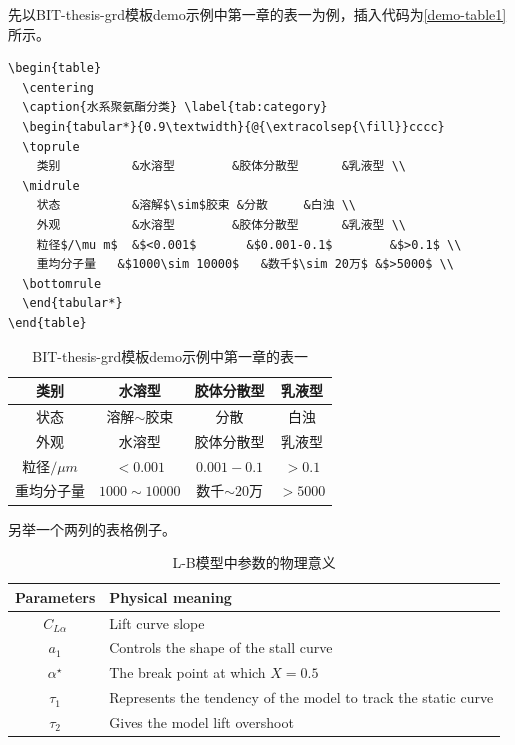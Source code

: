 先以BIT-thesis-grd模板demo示例中第一章的表一为例，插入代码为\ref{demo-table1}所示。

\begin{lstlisting}[language={[LaTeX]TeX}, caption={示例插表代码}, label=demo-table1]
\begin{table}
  \centering
  \caption{水系聚氨酯分类} \label{tab:category}
  \begin{tabular*}{0.9\textwidth}{@{\extracolsep{\fill}}cccc}
  \toprule
    类别			&水溶型		&胶体分散型		&乳液型 \\
  \midrule
    状态			&溶解$\sim$胶束	&分散		&白浊 \\
    外观			&水溶型		&胶体分散型		&乳液型 \\
    粒径$/\mu m$	&$<0.001$		&$0.001-0.1$		&$>0.1$ \\
    重均分子量	&$1000\sim 10000$	&数千$\sim 20万$ &$>5000$ \\
  \bottomrule
  \end{tabular*}
\end{table}
\end{lstlisting}

\begin{table}
  \centering
  \caption{BIT-thesis-grd模板demo示例中第一章的表一} \label{tab:category}
  \begin{tabular*}{0.9\textwidth}{@{\extracolsep{\fill}}cccc}
  \toprule
    类别			&水溶型		&胶体分散型		&乳液型 \\
  \midrule
    状态			&溶解$\sim$胶束	&分散		&白浊 \\
    外观			&水溶型		&胶体分散型		&乳液型 \\
    粒径$/\mu m$	&$<0.001$		&$0.001-0.1$		&$>0.1$ \\
    重均分子量	&$1000\sim 10000$	&数千$\sim 20万$ &$>5000$ \\
  \bottomrule
  \end{tabular*}
\end{table}

另举一个两列的表格例子。

\begin{table}              %
\centering
 \begin{center}
  \caption{L-B模型中参数的物理意义}
  \label{tab:LB-parameters}
  \begin{tabular}{cl}
      \toprule
       Parameters & Physical meaning       \\
      \midrule   %
       $C_{L\alpha}$ & Lift curve slope \\
       $a_{1}$ & Controls the shape of the stall curve \\
       $\alpha^{\star}$ & The break point at which $X=0.5$ \\
       $\tau_{1}$ & Represents the tendency of the model to track the static curve \\
       $\tau_{2}$ & Gives the model lift overshoot \\
      \bottomrule
  \end{tabular}
 \end{center}
\end{table}

